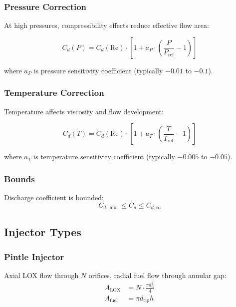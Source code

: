 \documentclass[12pt,a4paper]{article}
\begin{document}
\subsubsection{Pressure Correction}

At high pressures, compressibility effects reduce effective flow area:

\begin{equation}
C_d(P) = C_d(\text{Re}) \cdot \left[1 + a_P \cdot \left(\frac{P}{P_{\text{ref}}} - 1\right)\right]
\end{equation}

where $a_P$ is pressure sensitivity coefficient (typically $-0.01$ to $-0.1$).

\subsubsection{Temperature Correction}

Temperature affects viscosity and flow development:

\begin{equation}
C_d(T) = C_d(\text{Re}) \cdot \left[1 + a_T \cdot \left(\frac{T}{T_{\text{ref}}} - 1\right)\right]
\end{equation}

where $a_T$ is temperature sensitivity coefficient (typically $-0.005$ to $-0.05$).

\subsubsection{Bounds}

Discharge coefficient is bounded:
\begin{equation}
C_{d,\min} \leq C_d \leq C_{d,\infty}
\end{equation}

\subsection{Injector Types}

\subsubsection{Pintle Injector}

Axial LOX flow through $N$ orifices, radial fuel flow through annular gap:
\begin{align}
A_{\text{LOX}} &= N \cdot \frac{\pi d_O^2}{4} \\
A_{\text{fuel}} &= \pi d_{\text{tip}} h
\end{align}
\end{document}
